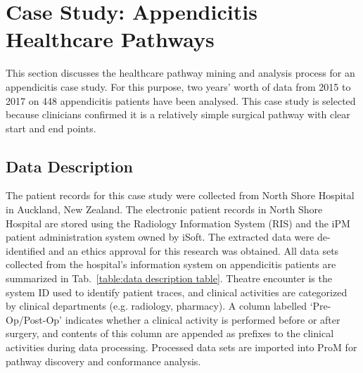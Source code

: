 \section{Case Study: Appendicitis Healthcare Pathways}
This section discusses the healthcare pathway mining and analysis process for an appendicitis case study. For this purpose, two years’ worth of data
from 2015 to 2017 on 448 appendicitis patients have been analysed. This case study is selected because clinicians confirmed it is a relatively simple surgical pathway with clear start and end points.

\subsection{Data Description}
\label{Sec:DataDescription}
The patient records for this case study were collected from North Shore Hospital in Auckland, New Zealand. The electronic patient records in North Shore Hospital are stored using the Radiology Information System (RIS) and the iPM patient administration system owned by iSoft.
The extracted data were de-identified and an ethics approval for this research was obtained. All data sets collected from the hospital's information system on appendicitis patients are summarized in Tab.~\ref{table:data description table}. Theatre encounter is the system ID used to identify patient traces, and clinical activities are categorized by clinical departments (e.g. radiology, pharmacy). A column labelled `Pre-Op/Post-Op' indicates whether a clinical activity is performed before or after surgery, and contents of this column are appended as prefixes to the clinical activities during data processing. Processed data sets are imported into ProM for pathway discovery and conformance analysis.

\newcommand{\tabitem}{~~\llap{\textbullet}~~}

